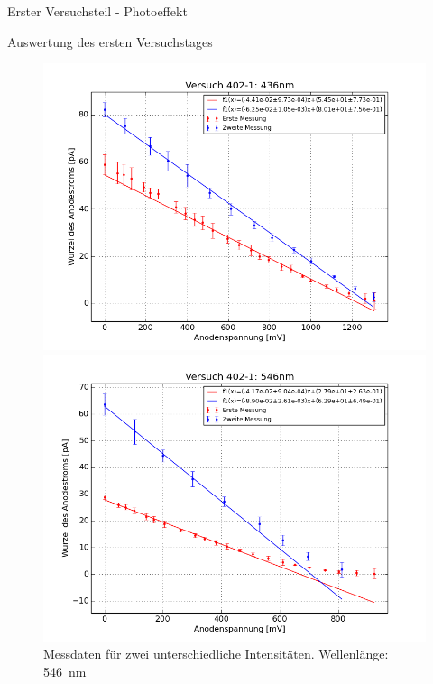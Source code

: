 \documentclass[pdftex, a4paper,11pt, twoside, ngerman]{report}
\begin{document}
\begin{chapter}{Erster Versuchsteil - Photoeffekt}
\begin{section}{Auswertung des ersten Versuchstages}
\begin{figure}[htbp]
\begin{minipage}{0.48\textwidth}
          \includegraphics[width=\textwidth]{Figures/Versuch402_1_436.png}
          \caption{Messdaten für zwei unterschiedliche Intensitäten. 
              Wellenlänge: \SI{436}{\nano\meter}}
          \label{fig:Versuch402_1_436}
        \end{minipage}
        \begin{minipage}{0.48\textwidth}
          \centering
          \includegraphics[width=\textwidth]{Figures/Versuch402_1_546.png}
          \caption{Messdaten für zwei unterschiedliche Intensitäten. 
              Wellenlänge: \SI{546}{\nano\meter}}
          \label{fig:Versuch402_1_546}
        \end{minipage}\quad
        \begin{minipage}{0.48\textwidth}

\end{minipage}
\end{figure}
\end{section}
\end{chapter}
\end{document}
